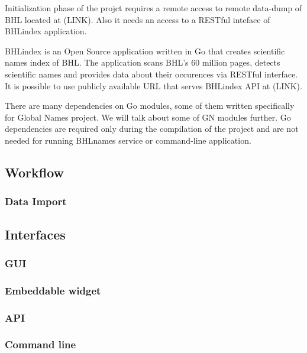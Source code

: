 \documentclass[
]{article}
\begin{document}
Initialization phase of the projct requires a remote access to remote
data-dump of BHL located at (LINK). Also it needs an access to a RESTful
inteface of BHLindex application.

BHLindex is an Open Source application written in Go that creates
scientific names index of BHL. The application scans BHL's 60 million
pages, detects scientific names and provides data about their occurences
via RESTful interface. It is possible to use publicly available URL that
serves BHLindex API at (LINK).

There are many dependencies on Go modules, some of them written
specifically for Global Names project. We will talk about some of GN
modules further. Go dependencies are required only during the
compilation of the project and are not needed for running BHLnames
service or command-line application.

\hypertarget{workflow}{%
\subsection{Workflow}\label{workflow}}

\hypertarget{data-import}{%
\subsubsection{Data Import}\label{data-import}}

\hypertarget{interfaces}{%
\subsection{Interfaces}\label{interfaces}}

\hypertarget{gui}{%
\subsubsection{GUI}\label{gui}}

\hypertarget{embeddable-widget}{%
\subsubsection{Embeddable widget}\label{embeddable-widget}}

\hypertarget{api}{%
\subsubsection{API}\label{api}}

\hypertarget{command-line}{%
\subsubsection{Command line}\label{command-line}}
\end{document}
